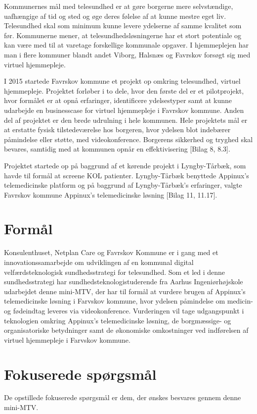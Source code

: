 Kommunernes mål med telesundhed er at gøre borgerne mere selvstændige, uafhængige af tid og sted og øge deres følelse af at kunne mestre eget liv. Telesundhed skal som minimum kunne levere ydelserne af samme kvalitet som før\cite{KLs}. Kommunerne mener, at telesundhedsløsningerne har et stort potentiale og kan være med til at varetage forskellige kommunale opgaver. I hjemmeplejen har man i flere kommuner blandt andet Viborg\cite{viborg}, Halsnæs\cite{hals} og Favrskov forsøgt sig med virtuel hjemmepleje. 

I 2015 startede Favrskov kommune et projekt op omkring telesundhed, virtuel hjemmepleje. Projektet forløber i to dele, hvor den første del er et pilotprojekt, hvor formålet er at opnå erfaringer, identificere ydelsestyper samt at kunne udarbejde en businesscase for virtuel hjemmepleje i Favrskov kommune. Anden del af projektet er den brede udrulning i hele kommunen. Hele projektets mål er at erstatte fysisk tilstedeværelse hos borgeren, hvor ydelsen blot indebærer påmindelse eller støtte, med videokonference. Borgerens sikkerhed og tryghed skal bevares, samtidig med at kommunen opnår en effektivisering [Bilag 8, 8.3]. 

Projektet startede op på baggrund af et kørende projekt i Lyngby-Tårbæk, som havde til formål at screene KOL patienter. Lyngby-Tårbæk benyttede Appinux's telemedicinske platform og på baggrund af Lyngby-Tårbæk's erfaringer, valgte Favrskov kommune Appinux's telemedicinske løsning [Bilag 11, 11.17].

\section{Formål}
Konsulenthuset, Netplan Care og Favrskov Kommune er i gang med et innovationssamarbejde om udviklingen af en kommunal digital velfærdsteknologisk sundhedsstrategi for telesundhed. Som et led i denne sundhedsstrategi har sundhedsteknologistuderende fra Aarhus Ingeniørhøjskole udarbejdet denne mini-MTV, der har til formål at vurdere brugen af Appinux's telemedicinske løsning i Farvskov kommune, hvor ydelsen påmindelse om medicin- og fødeindtag leveres via videokonference. Vurderingen vil tage udgangspunkt i teknologien omkring Appinux's telemedicinske løsning, de borgmæssige- og organisatoriske betydninger samt de økonomiske omkostninger ved indførelsen af virtuel hjemmepleje i Farvskov kommune.  

\section{Fokuserede spørgsmål}
De opstillede fokuserede spørgsmål er dem, der ønskes besvares gennem denne mini-MTV. 

